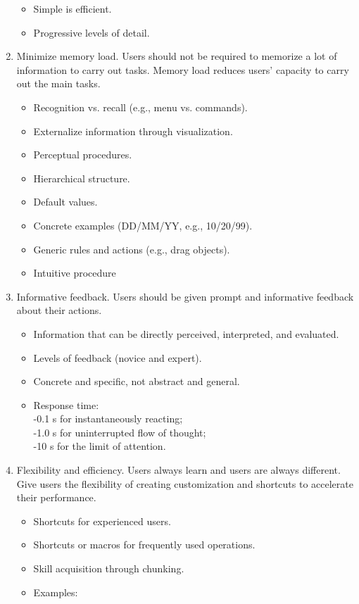 \documentclass[letterpaper,cleveref]{lipics-v2019}
\theoremstyle{definition}
\begin{document}
\begin{enumerate}
\begin{itemize}
\item Simple is efficient.
\item  Progressive levels of detail.
\end{itemize}
\item Minimize memory load. Users should not be required to memorize a lot of information to carry out tasks. Memory load reduces users’ capacity to carry out the main tasks. 
\begin{itemize}
\item Recognition vs. recall (e.g., menu vs. commands).
\item Externalize information through visualization.
\item Perceptual procedures.
\item Hierarchical structure.
\item Default values.
\item Concrete examples (DD/MM/YY, e.g., 10/20/99).
\item Generic rules and actions (e.g., drag objects).
\item Intuitive procedure
\end{itemize}
\item Informative feedback. Users should be given prompt and informative feedback about their actions. 
\begin{itemize}
\item Information that can be directly perceived, interpreted, and evaluated.
\item Levels of feedback (novice and expert).
\item Concrete and specific, not abstract and general.
\item Response time:\\
-0.1 s for instantaneously reacting;\\
-1.0 s for uninterrupted flow of thought;\\
-10 s for the limit of attention.
\end{itemize}
\item Flexibility and efficiency. Users always learn and users are always different. Give users the flexibility of creating customization and shortcuts to accelerate their performance. 
\begin{itemize}
	\item Shortcuts for experienced users.
	\item Shortcuts or macros for frequently used operations.
	\item Skill acquisition through chunking.
	\item Examples:

\end{itemize}
\end{enumerate}
\end{document}
